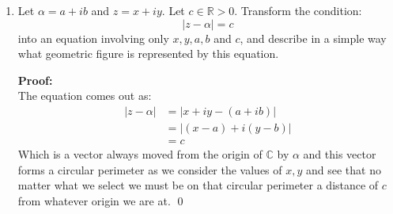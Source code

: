 \begin{enumerate}
\begin{enumerate}
		\item $|z| - |w| \leq |z - w|$ \\
		
		\textbf{Proof:} \\
		By (a) above we just subtract $|w|$ off the right and left, and have a logically equivalent statement.
		\qed


		\item $|z| - |w| \leq |z + w|$ \\
		
		\textbf{Proof:} \\
		If the above were not true, then (b) would be false, but (b) is true, so then: 
		\[|z| -|w| \leq |z + w| \]
		\qed
	\end{enumerate}
	
	\item Let $\alpha = a +ib$ and $z = x +iy.$ Let $c \in \mathbb{R} > 0.$ Transform the condition:
	$$|z - \alpha| = c$$
	into an equation involving only $x, y, a, b$ and $c$, and describe in a simple way what geometric figure is represented by this equation.

	\textbf{Proof:} \\
	The equation comes out as:
	\begin{align*}
		|z - \alpha| &= | x + iy - (a + ib) | \\
		&= | (x - a) + i(y - b) | \\
		&= c
	\end{align*}
	Which is a vector always moved from the origin of $\mathbb{C}$ by $\alpha$ and this vector forms a circular perimeter as we consider the values 
	of $x, y$ and see that no matter what we select we must be on that circular perimeter a distance of $c$ from whatever origin we are at.
	\qed
	

\end{enumerate}
